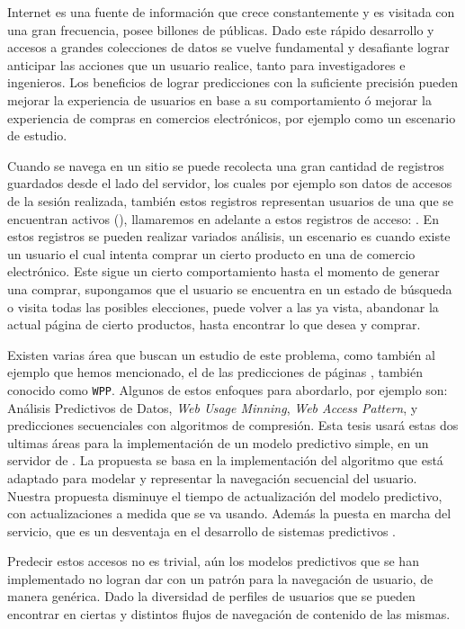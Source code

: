 %
%
%
Internet es una fuente de información que crece constantemente y es visitada con una gran frecuencia, posee billones de \webs públicas. Dado este rápido desarrollo y accesos a grandes colecciones de datos se vuelve fundamental y desafiante lograr anticipar las acciones que un usuario realice, tanto para investigadores e ingenieros. Los beneficios de lograr predicciones con la suficiente precisión pueden  mejorar la experiencia de usuarios en base a su comportamiento ó mejorar la experiencia de compras en comercios electrónicos, por ejemplo como un escenario de estudio.

Cuando se navega en un sitio \web se puede recolecta una gran cantidad de registros guardados desde el lado del servidor, los cuales por ejemplo son datos de accesos de la sesión realizada,  también estos registros representan usuarios de una \web que se encuentran activos (\online), llamaremos en adelante a estos registros de acceso: \webasccesslog. En estos registros se pueden realizar variados análisis, un escenario es cuando existe un usuario el cual intenta comprar un cierto producto en una \web de comercio electrónico. Este sigue un cierto comportamiento hasta el momento de generar una comprar, supongamos que el usuario se encuentra en un estado de búsqueda o visita todas las posibles elecciones, puede volver a las ya vista, abandonar la actual página de cierto productos, hasta encontrar lo que desea y comprar.

Existen varias área que buscan un estudio de este problema, como también al ejemplo que hemos mencionado, el de las predicciones de páginas \web, también conocido como \texttt{WPP}. Algunos de estos enfoques para  abordarlo, por ejemplo son:  Análisis Predictivos de Datos, \emph{Web Usage Minning}, \emph{Web Access Pattern}, \machinelearning y predicciones secuenciales con algoritmos de compresión. Esta tesis usará estas dos ultimas áreas para la implementación de un modelo predictivo simple, en un servidor de \machinelearning. La  propuesta se basa en la implementación del algoritmo \lzSieteOcho que está adaptado para modelar y representar la navegación secuencial del usuario. Nuestra propuesta disminuye el tiempo de actualización del modelo predictivo, con actualizaciones a medida que se va usando. Además la puesta en marcha del servicio, que es un desventaja en el desarrollo de sistemas predictivos \online.


Predecir estos  accesos no es trivial, aún los modelos predictivos que se han implementado no logran dar con un patrón para la navegación de usuario, de manera genérica. Dado la diversidad de perfiles de usuarios que se pueden encontrar en ciertas \webs  y distintos flujos de navegación de contenido de las mismas.  

